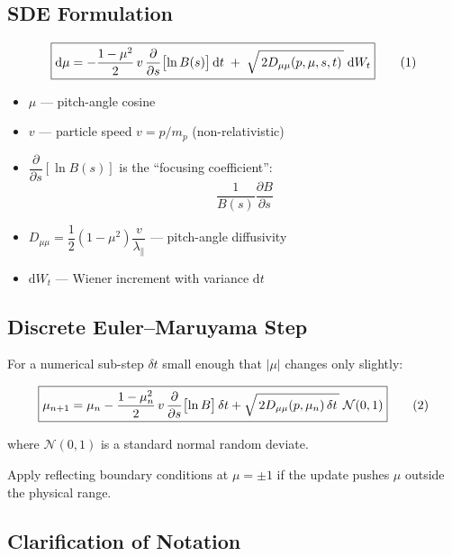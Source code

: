 {\subsection*{SDE Formulation}

\begin{equation}
\boxed{%
\displaystyle
\mathrm{d}\mu
= -\frac{1 - \mu^{2}}{2}\,v\,
    \frac{\partial}{\partial s}\bigl[\ln B(s)\bigr]\,
    \mathrm{d}t
  \;+\;\sqrt{\,2D_{\mu\mu}(p,\mu,s,t)\,}\;
    \mathrm{d}W_t
}
\tag{1}
\end{equation}

\begin{itemize}
  \item \( \mu \) — pitch-angle cosine
  \item \( v \) — particle speed \( v = p / m_{p} \) (non-relativistic)
  \item \( \dfrac{\partial}{\partial s}[\ln B(s)] \) is the “focusing coefficient”:
  \[
  \frac{1}{B(s)} \frac{\partial B}{\partial s}
  \]
  \item \( D_{\mu\mu} = \dfrac{1}{2}(1 - \mu^{2}) \dfrac{v}{\lambda_{\parallel}} \) — pitch-angle diffusivity
  \item \( \mathrm{d}W_t \) — Wiener increment with variance \( \mathrm{d}t \)
\end{itemize}

\subsection*{Discrete Euler–Maruyama Step}

For a numerical sub-step \( \delta t \) small enough that \( |\mu| \) changes only slightly:

\begin{equation}
\boxed{%
\displaystyle
\mu_{n+1}
= \mu_n
- \frac{1 - \mu_n^2}{2}\,v\,
  \frac{\partial}{\partial s}\bigl[\ln B\bigr]\,
  \delta t
+ \sqrt{\,2D_{\mu\mu}(p,\mu_n)\,\delta t\,}\;
  \mathcal{N}(0,1)
}
\tag{2}
\end{equation}

where \( \mathcal{N}(0,1) \) is a standard normal random deviate.

Apply reflecting boundary conditions at \( \mu = \pm1 \) if the update pushes \( \mu \) outside the physical range.

\subsection*{Clarification of Notation}

}
